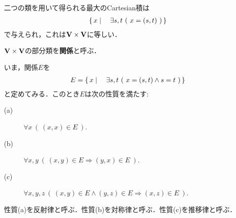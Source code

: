 	\begin{comment}
	\monologue{
		院生「類$a$と類$b$のCartesian 積は
			\begin{align}
				a \times b = \Set{(s,t)}{s \in a \wedge t \in b} 
			\end{align}
			と簡略して書かれることも多いです．ところで他の本やネットなどを見ていると
			Cartesian 積を直積とも呼んでいるそうです．本稿でも後で直積というものを定義いたしますが，
			本稿ではCartesian 積と直積を明確に区別いたします．
			これは巷にあふれる直積の定義の不自然さを解消するためです．
			どういう点が不自然であるか簡単に説明いたしましょう．
			まだ有限とか数だとか定義していませんが，説明の便宜のために使用いたします．
			よく見る直積の定義だと，有限か有限でないかで直積の定め方が変わります．
			\begin{align}
				I_1 \times I_2 \times \cdots \times I_n 
				= \Set{(x_1,x_2,\cdots,x_n)}{x_1 \in I_1 \wedge x_2 \in I_2 \wedge
				\cdots \wedge x_n \in I_n}
			\end{align}
			そして
			\begin{align}
				I_1 \times I_2 \times \cdots \times I_n 
				= \prod_{i=1}^n I_i
			\end{align}
			と書いている．ここで
			$\prod_{i=1}^n I_i$は$\prod_{i\in\{1,2,\cdots,n\}} I_i$の別の記法です．
			他方$I$を$\{1,2,\cdots,n\}$から$V$への写像と見ることもできますから
			\begin{align}
				\prod_{i=1}^n I_i = \Set{f}{f:\{1,2,\cdots,n\} \longrightarrow V \wedge \forall i \in \{1,2,\cdots,n\}\ (\ f(i) \in I_i\ )}
			\end{align}
			となるはずです．食い違います．
			」
	}
	\end{comment}
	
	二つの類を用いて得られる最大のCartesian積は
	\begin{align}
		\left\{\, x \mid \quad \exists s,t\ (\ x=(s,t)\ )\, \right\}
	\end{align}
	で与えられ，これは$\mathbf{V} \times \mathbf{V}$に等しい．
	
	\begin{screen}
		\begin{dfn}[関係]
			$\mathbf{V} \times \mathbf{V}$の部分類を{\bf 関係}と呼ぶ．
		\end{dfn}
	\end{screen}
	
	いま，関係$E$を
	\begin{align}
		E = \left\{\, x \mid \quad \exists s,t\ (\ x=(s,t) \wedge s = t\ )\, \right\}
	\end{align}
	と定めてみる．このとき$E$は次の性質を満たす:
	\begin{description}
		\item[(a)] $\forall x\ (\ (x,x) \in E\ )$.
		\item[(b)] $\forall x,y\ (\ (x,y) \in E \Longrightarrow (y,x) \in E\ )$.
		\item[(c)] $\forall x,y,z\ (\ (x,y) \in E \wedge (y,z) \in E \Longrightarrow (x,z) \in E\ )$.
	\end{description}
	性質(a)を反射律と呼ぶ．性質(b)を対称律と呼ぶ．性質(c)を推移律と呼ぶ．
	
